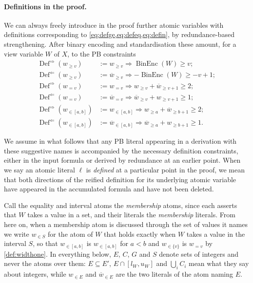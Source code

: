 \documentclass[11pt,a4paper]{article}
\theoremstyle{plain}
\theoremstyle{definition}
\theoremstyle{remark}
\newcommand{\fname}[1]{\ensuremath{\operatorname{#1}}}
\newcommand{\BinEnc}{\fname{BinEnc}}
\newcommand{\Def}{\fname{Def}}
\newcommand{\atge}[2]{#1_{\geq #2}}
\newcommand{\ateq}[2]{#1_{= #2}}
\newcommand{\atin}[3]{#1_{\in[#2,#3]}}
\newcommand{\natge}[2]{\overline{#1}_{\geq #2}}
\newcommand{\nateq}[2]{\overline{#1}_{= #2}}
\newcommand{\natin}[3]{\overline{#1}_{\in[#2,#3]}}
\newcommand{\atset}[2]{#1_{\in #2}}
\newcommand{\natset}[2]{\overline{#1}_{\in #2}}
\begin{document}
\paragraph{Definitions in the proof.}
We can always freely introduce in the proof further atomic variables with
definitions corresponding to \cref{eq:defge,eq:defeq,eq:defin}, by
redundance-based strengthening.  After binary encoding and standardisation
these amount, for a view variable $W$ of $X$, to the PB constraints
\begin{align}
  \Def^{\Rightarrow}(\atge{w}{v}) &:= \atge{w}{v} \Rightarrow \BinEnc(W)\geq v;
    \label{eq:dge1}\\
  \Def^{\Leftarrow}(\atge{w}{v}) &:= \natge{w}{v} \Rightarrow
    -\BinEnc(W)\geq -v+1; \label{eq:dge2}\\
  \Def^{\Rightarrow}(\ateq{w}{v}) &:= \ateq{w}{v} \Rightarrow
    \atge{w}{v} + \natge{w}{v+1} \geq 2; \label{eq:deq1}\\
  \Def^{\Leftarrow}(\ateq{w}{v}) &:= \nateq{w}{v} \Rightarrow
    \natge{w}{v} + \atge{w}{v+1} \geq 1; \label{eq:deq2}\\
  \Def^{\Rightarrow}(\atin{w}{a}{b}) &:= \atin{w}{a}{b} \Rightarrow
    \atge{w}{a} + \natge{w}{b+1} \geq 2; \label{eq:din1}\\
  \Def^{\Leftarrow}(\atin{w}{a}{b}) &:= \natin{w}{a}{b} \Rightarrow
    \natge{w}{a} + \atge{w}{b+1} \geq 1. \label{eq:din2}
\end{align}

We assume in what follows that any PB literal appearing in a derivation with
these suggestive names is accompanied by the necessary definition constraints,
either in the input formula or derived by redundance at an earlier point.  When
we say an atomic literal $\ell$ is \emph{defined} at a particular point in the
proof, we mean that both directions of the reified definition for its
underlying atomic variable have appeared in the accumulated formula and have
not been deleted.

Call the equality and interval atoms the \emph{membership} atoms, since each
asserts that $W$ takes a value in a set, and their literals the
\emph{membership} literals.  From here on, when a membership atom is
discussed through the set of values it names we write $\atset{w}{S}$ for the
atom of $W$ that holds exactly when $W$ takes a value in the interval $S$, so
that $\atset{w}{[a,b]}$ is $\atin{w}{a}{b}$ for $a<b$ and $\atset{w}{\{v\}}$ is
$\ateq{w}{v}$ by \cref{def:widthone}.  In everything below, $E$, $C$, $G$ and
$S$ denote sets of integers and never the atoms over them: $E\subseteq E'$,
$E\cap[l_W,u_W]$ and $\bigcup_i C_i$ mean what they say about integers, while
$\atset{w}{E}$ and $\natset{w}{E}$ are the two literals of the atom naming $E$.
\end{document}
